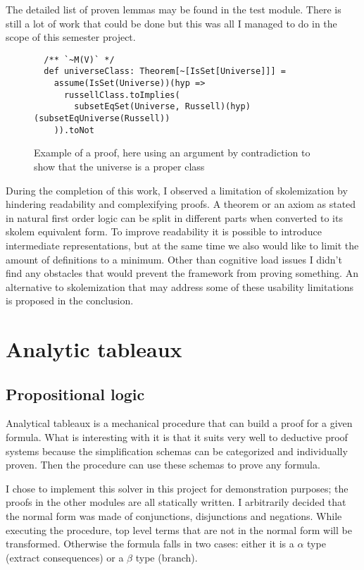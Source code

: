 \documentclass[acmlarge]{acmart}
\begin{document}
The detailed list of proven lemmas may be found in the test module. There is still a lot of work that could be done but this was all I managed to do in the scope of this semester project.

\begin{figure}
\begin{verbatim}
  /** `~M(V)` */
  def universeClass: Theorem[~[IsSet[Universe]]] =
    assume(IsSet(Universe))(hyp =>
      russellClass.toImplies(
        subsetEqSet(Universe, Russell)(hyp)(subsetEqUniverse(Russell))
    )).toNot
\end{verbatim}
\caption{Example of a proof, here using an argument by contradiction to show that the universe is a proper class}
\end{figure}

During the completion of this work, I observed a limitation of skolemization by hindering readability and complexifying proofs. A theorem or an axiom as stated in natural first order logic can be split in different parts when converted to its skolem equivalent form. To improve readability it is possible to introduce intermediate representations, but at the same time we also would like to limit the amount of definitions to a minimum. Other than cognitive load issues I didn't find any obstacles that would prevent the framework from proving something. An alternative to skolemization that may address some of these usability limitations is proposed in the conclusion.

\section{Analytic tableaux}

\subsection{Propositional logic}

Analytical tableaux is a mechanical procedure that can build a proof for a given formula. What is interesting with it is that it suits very well to deductive proof systems because the simplification schemas can be categorized and individually proven. Then the procedure can use these schemas to prove any formula.

I chose to implement this solver in this project for demonstration purposes; the proofs in the other modules are all statically written. I arbitrarily decided that the normal form was made of conjunctions, disjunctions and negations. While executing the procedure, top level terms that are not in the normal form will be transformed. Otherwise the formula falls in two cases: either it is a $\alpha$ type (extract consequences) or a $\beta$ type (branch).
\end{document}
